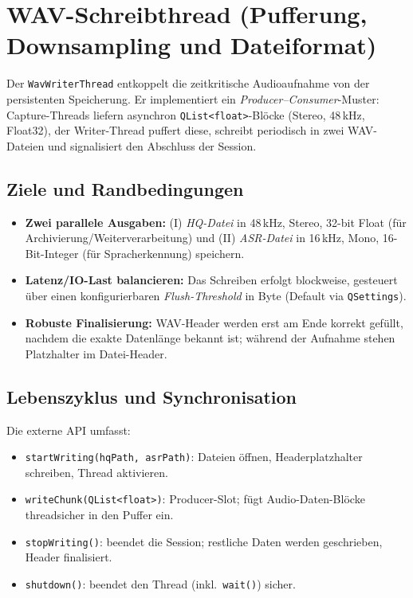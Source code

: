 
\chapter{WAV-Schreibthread (Pufferung, Downsampling und Dateiformat)}
\label{chap:wav_thread}



Der \texttt{WavWriterThread} entkoppelt die zeitkritische Audioaufnahme von der persistenten Speicherung. Er implementiert ein \emph{Producer–Consumer}-Muster: Capture-Threads liefern asynchron \texttt{QList<float>}-Blöcke (Stereo, 48\,kHz, Float32), der Writer-Thread puffert diese, schreibt periodisch in zwei WAV-Dateien und signalisiert den Abschluss der Session.


\section{Ziele und Randbedingungen}

\begin{itemize}
    \item \textbf{Zwei parallele Ausgaben:}
    (I) \emph{HQ-Datei} in 48\,kHz, Stereo, 32-bit Float (für Archivierung/Weiterverarbeitung) und (II) \emph{ASR-Datei} in 16\,kHz, Mono, 16-Bit-Integer (für Spracherkennung) speichern.

    \item \textbf{Latenz/IO-Last balancieren:} Das Schreiben erfolgt blockweise, gesteuert über einen konfigurierbaren \emph{Flush-Threshold} in Byte (Default via \texttt{QSettings}).

    \item \textbf{Robuste Finalisierung:} WAV-Header werden erst am Ende korrekt gefüllt, nachdem die exakte Datenlänge bekannt ist; während der Aufnahme stehen Platzhalter im Datei-Header.
\end{itemize}


\section{Lebenszyklus und Synchronisation}

Die externe API umfasst:
\begin{itemize}
    \item \texttt{startWriting(hqPath, asrPath)}: Dateien öffnen, Headerplatzhalter schreiben, Thread aktivieren.

    \item \texttt{writeChunk(QList<float>)}: Producer-Slot; fügt Audio-Daten-Blöcke threadsicher in den Puffer ein.

    \item \texttt{stopWriting()}: beendet die Session; restliche Daten werden geschrieben, Header finalisiert.

    \item \texttt{shutdown()}: beendet den Thread (inkl.\ \texttt{wait()}) sicher.
\end{itemize}


